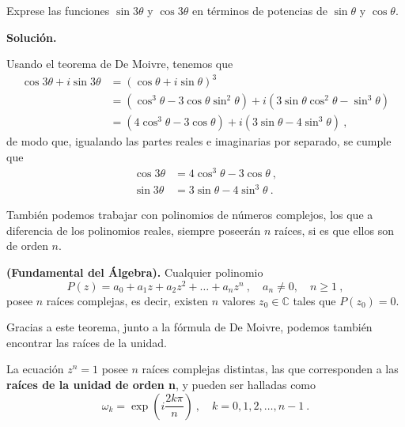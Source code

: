 \begin{ejemplo}
    Exprese las funciones $\sin{3\theta}$ y $\cos{3\theta}$ en términos de potencias de $\sin{\theta}$ y $\cos{\theta}$.

    \noindent \textbf{Solución.}

    Usando el teorema de De Moivre, tenemos que 
    \begin{align*}
        \cos{3\theta} + i \sin{3\theta} & = (\cos{\theta} + i \sin{\theta})^3 \\
        & = (\cos^3{\theta} - 3\cos{\theta}\sin^2{\theta}) + i (3\sin{\theta} \cos^2{\theta} - \sin^3{\theta}) \\
        & = (4\cos^3{\theta} - 3\cos{\theta}) + i(3\sin{\theta} - 4\sin^3{\theta}) \ ,
    \end{align*}
    de modo que, igualando las partes reales e imaginarias por separado, se cumple que 
    \begin{align*}
        \cos{3\theta} & = 4\cos^3{\theta} - 3\cos{\theta} \ , \\
        \sin{3\theta} & = 3\sin{\theta} - 4\sin^3{\theta} \ .
    \end{align*}
\end{ejemplo}

También podemos trabajar con polinomios de números complejos, los que a diferencia de los polinomios reales, siempre poseerán $n$ raíces, si es que ellos son de orden $n$.

\begin{teorema}{\textbf{(Fundamental del Álgebra).}}
    Cualquier polinomio 
    \begin{equation}
        P(z) = a_0 +  a_1 z + a_2 z^2 + \dots + a_n z^n \ , \quad a_n \neq 0 , \quad n \geq 1 \ ,
    \end{equation}
    posee $n$ raíces complejas, es decir, existen $n$ valores $z_0 \in \mathbb{C}$ tales que $P(z_0) = 0$.
\end{teorema}

Gracias a este teorema, junto a la fórmula de De Moivre, podemos también encontrar las raíces de la unidad.

\begin{defi}
    La ecuación $z^n = 1$ posee $n$ raíces complejas distintas, las que corresponden a las \textbf{raíces de la unidad de orden n}, y pueden ser halladas como 
    \begin{equation}
        \omega_k = \exp\left( i\frac{2k\pi}{n} \right) \ , \quad k = 0, 1, 2, \dots, n-1 \ .
    \end{equation}
\end{defi}

